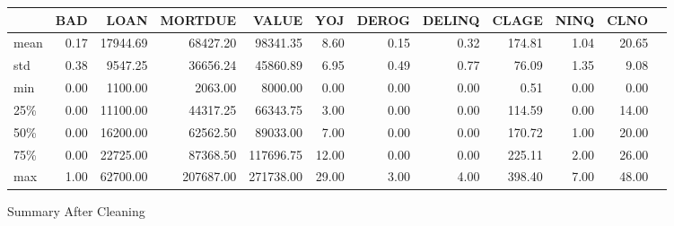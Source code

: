 \begin{landscape}
\begin{figure}[ht]
	\centering
	\renewcommand{\arraystretch}{2}
	\begin{tabular}{lrrrrrrrrrrr}
	\toprule
	{} &      BAD &      LOAN &    MORTDUE &      VALUE &      YOJ &    DEROG &   DELINQ &    CLAGE &     NINQ &     CLNO \\
	\midrule
	mean  &     0.17 &  17944.69 &   68427.20 &   98341.35 &     8.60 &     0.15 &     0.32 &   174.81 &     1.04 &    20.65 \\
	std   &     0.38 &   9547.25 &   36656.24 &   45860.89 &     6.95 &     0.49 &     0.77 &    76.09 &     1.35 &     9.08  \\
	min   &     0.00 &   1100.00 &    2063.00 &    8000.00 &     0.00 &     0.00 &     0.00 &     0.51 &     0.00 &     0.00  \\
	25\%   &     0.00 &  11100.00 &   44317.25 &   66343.75 &     3.00 &     0.00 &     0.00 &   114.59 &     0.00 &    14.00  \\
	50\%   &     0.00 &  16200.00 &   62562.50 &   89033.00 &     7.00 &     0.00 &     0.00 &   170.72 &     1.00 &    20.00  \\
	75\%   &     0.00 &  22725.00 &   87368.50 &  117696.75 &    12.00 &     0.00 &     0.00 &   225.11 &     2.00 &    26.00  \\
	max   &     1.00 &  62700.00 &  207687.00 &  271738.00 &    29.00 &     3.00 &     4.00 &   398.40 &     7.00 &    48.00  \\
	\bottomrule
	\end{tabular}
	\caption{Summary After Cleaning \label{SUM_AFT_TBL}}
\end{figure}
\end{landscape}

